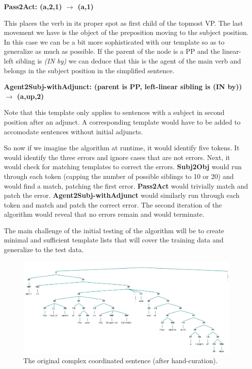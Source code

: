 \documentclass{article}
\begin{document}
\begin{center}
\textbf{Pass2Act: (a,2,1) $\rightarrow$ (a,1)}
\end{center}

This places the verb in its proper spot as first child of the topmost VP. The last movement we have is the object of the preposition moving to the subject position. In this case we can be a bit more sophisticated with our template so as to generalize as much as possible. If the parent of the node is a PP and the linear-left sibling is \textit{(IN by)} we can deduce that this is the agent of the main verb and belongs in the subject position in the simplified sentence.

\begin{center}
\textbf{Agent2Subj-withAdjunct: (parent is PP, left-linear sibling is (IN by)) $\rightarrow$ (a,up,2)}
\end{center}

Note that this template only applies to sentences with a subject in second position after an adjunct. A corresponding template would have to be added to accomodate sentences without initial adjuncts.

So now if we imagine the algorithm at runtime, it would identify five tokens. It would identify the three errors and ignore cases that are not errors. Next, it would check for matching templates to correct the errors. \textbf{Subj2Obj} would run through each token (capping the number of possible siblings to 10 or 20) and would find a match, patching the first error. \textbf{Pass2Act} would trivially match and patch the error. \textbf{Agent2Subj-withAdjunct} would similarly run through each token and match and patch the correct error. The second iteration of the algorithm would reveal that no errors remain and would terminate.

The main challenge of the initial testing of the algorithm will be to create minimal and sufficient template lists that will cover the training data and generalize to the test data.

\begin{figure}
\includegraphics[scale=.45]{coord_tree}
\caption{The original complex coordinated sentence (after hand-curation).}
\end{figure}
\end{document}
